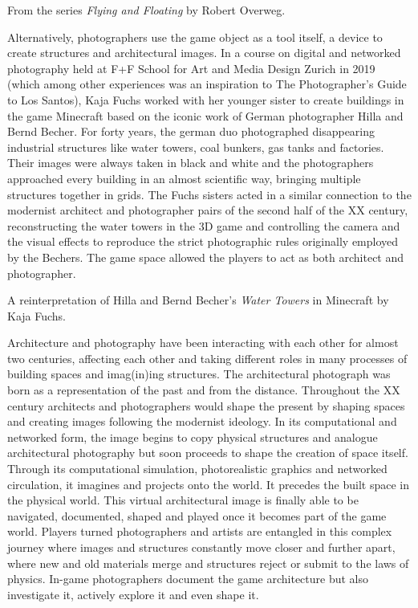 \documentclass[
  openany]{book}
\begin{document}
From the series \emph{Flying and Floating} by Robert Overweg.

Alternatively, photographers use the game object as a tool itself, a device to create structures and architectural images. In a course on digital and networked photography held at F+F School for Art and Media Design Zurich in 2019 (which among other experiences was an inspiration to The Photographer's Guide to Los Santos), Kaja Fuchs worked with her younger sister to create buildings in the game Minecraft based on the iconic work of German photographer Hilla and Bernd Becher. For forty years, the german duo photographed disappearing industrial structures like water towers, coal bunkers, gas tanks and factories. Their images were always taken in black and white and the photographers approached every building in an almost scientific way, bringing multiple structures together in grids. The Fuchs sisters acted in a similar connection to the modernist architect and photographer pairs of the second half of the XX century, reconstructing the water towers in the 3D game and controlling the camera and the visual effects to reproduce the strict photographic rules originally employed by the Bechers. The game space allowed the players to act as both architect and photographer.

A reinterpretation of Hilla and Bernd Becher's \emph{Water Towers} in Minecraft by Kaja Fuchs.

Architecture and photography have been interacting with each other for almost two centuries, affecting each other and taking different roles in many processes of building spaces and imag(in)ing structures. The architectural photograph was born as a representation of the past and from the distance. Throughout the XX century architects and photographers would shape the present by shaping spaces and creating images following the modernist ideology. In its computational and networked form, the image begins to copy physical structures and analogue architectural photography but soon proceeds to shape the creation of space itself. Through its computational simulation, photorealistic graphics and networked circulation, it imagines and projects onto the world. It precedes the built space in the physical world. This virtual architectural image is finally able to be navigated, documented, shaped and played once it becomes part of the game world. Players turned photographers and artists are entangled in this complex journey where images and structures constantly move closer and further apart, where new and old materials merge and structures reject or submit to the laws of physics. In-game photographers document the game architecture but also investigate it, actively explore it and even shape it.
\end{document}
